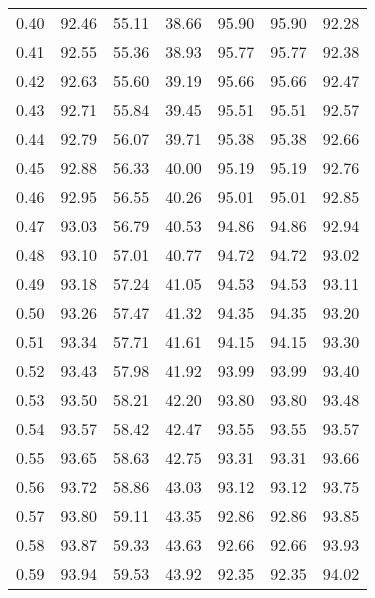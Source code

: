 \begin{tabular}{|c|c|c|c|c|c|c|}
      0.40 &     92.46 &     55.11 &      38.66 &   95.90 &      95.90 &         92.28 \\
      0.41 &     92.55 &     55.36 &      38.93 &   95.77 &      95.77 &         92.38 \\
      0.42 &     92.63 &     55.60 &      39.19 &   95.66 &      95.66 &         92.47 \\
      0.43 &     92.71 &     55.84 &      39.45 &   95.51 &      95.51 &         92.57 \\
      0.44 &     92.79 &     56.07 &      39.71 &   95.38 &      95.38 &         92.66 \\
      0.45 &     92.88 &     56.33 &      40.00 &   95.19 &      95.19 &         92.76 \\
      0.46 &     92.95 &     56.55 &      40.26 &   95.01 &      95.01 &         92.85 \\
      0.47 &     93.03 &     56.79 &      40.53 &   94.86 &      94.86 &         92.94 \\
      0.48 &     93.10 &     57.01 &      40.77 &   94.72 &      94.72 &         93.02 \\
      0.49 &     93.18 &     57.24 &      41.05 &   94.53 &      94.53 &         93.11 \\
      0.50 &     93.26 &     57.47 &      41.32 &   94.35 &      94.35 &         93.20 \\
      0.51 &     93.34 &     57.71 &      41.61 &   94.15 &      94.15 &         93.30 \\
      0.52 &     93.43 &     57.98 &      41.92 &   93.99 &      93.99 &         93.40 \\
      0.53 &     93.50 &     58.21 &      42.20 &   93.80 &      93.80 &         93.48 \\
      0.54 &     93.57 &     58.42 &      42.47 &   93.55 &      93.55 &         93.57 \\
      0.55 &     93.65 &     58.63 &      42.75 &   93.31 &      93.31 &         93.66 \\
      0.56 &     93.72 &     58.86 &      43.03 &   93.12 &      93.12 &         93.75 \\
      0.57 &     93.80 &     59.11 &      43.35 &   92.86 &      92.86 &         93.85 \\
      0.58 &     93.87 &     59.33 &      43.63 &   92.66 &      92.66 &         93.93 \\
      0.59 &     93.94 &     59.53 &      43.92 &   92.35 &      92.35 &         94.02 \\

\end{tabular}

